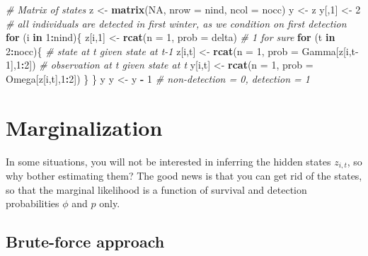 \documentclass[
  12pt,
]{krantz}
\newenvironment{Shaded}{\begin{snugshade}}{\end{snugshade}}
\newcommand{\AttributeTok}[1]{\textcolor[rgb]{0.13,0.29,0.53}{#1}}
\newcommand{\CommentTok}[1]{\textcolor[rgb]{0.56,0.35,0.01}{\textit{#1}}}
\newcommand{\ConstantTok}[1]{\textcolor[rgb]{0.56,0.35,0.01}{#1}}
\newcommand{\ControlFlowTok}[1]{\textcolor[rgb]{0.13,0.29,0.53}{\textbf{#1}}}
\newcommand{\DecValTok}[1]{\textcolor[rgb]{0.00,0.00,0.81}{#1}}
\newcommand{\FunctionTok}[1]{\textcolor[rgb]{0.13,0.29,0.53}{\textbf{#1}}}
\newcommand{\NormalTok}[1]{#1}
\newcommand{\OtherTok}[1]{\textcolor[rgb]{0.56,0.35,0.01}{#1}}
\newcommand{\SpecialCharTok}[1]{\textcolor[rgb]{0.81,0.36,0.00}{\textbf{#1}}}
\begin{document}
\begin{Shaded}
\begin{Highlighting}[]
\CommentTok{\# Matrix of states}
\NormalTok{z }\OtherTok{\textless{}{-}} \FunctionTok{matrix}\NormalTok{(}\ConstantTok{NA}\NormalTok{, }\AttributeTok{nrow =}\NormalTok{ nind, }\AttributeTok{ncol =}\NormalTok{ nocc)}
\NormalTok{y }\OtherTok{\textless{}{-}}\NormalTok{ z}
\NormalTok{y[,}\DecValTok{1}\NormalTok{] }\OtherTok{\textless{}{-}} \DecValTok{2} \CommentTok{\# all individuals are detected in first winter, as we condition on first detection}
\ControlFlowTok{for}\NormalTok{ (i }\ControlFlowTok{in} \DecValTok{1}\SpecialCharTok{:}\NormalTok{nind)\{}
\NormalTok{  z[i,}\DecValTok{1}\NormalTok{] }\OtherTok{\textless{}{-}} \FunctionTok{rcat}\NormalTok{(}\AttributeTok{n =} \DecValTok{1}\NormalTok{, }\AttributeTok{prob =}\NormalTok{ delta) }\CommentTok{\# 1 for sure}
  \ControlFlowTok{for}\NormalTok{ (t }\ControlFlowTok{in} \DecValTok{2}\SpecialCharTok{:}\NormalTok{nocc)\{}
    \CommentTok{\# state at t given state at t{-}1}
\NormalTok{    z[i,t] }\OtherTok{\textless{}{-}} \FunctionTok{rcat}\NormalTok{(}\AttributeTok{n =} \DecValTok{1}\NormalTok{, }\AttributeTok{prob =}\NormalTok{ Gamma[z[i,t}\DecValTok{{-}1}\NormalTok{],}\DecValTok{1}\SpecialCharTok{:}\DecValTok{2}\NormalTok{]) }
    \CommentTok{\# observation at t given state at t}
\NormalTok{    y[i,t] }\OtherTok{\textless{}{-}} \FunctionTok{rcat}\NormalTok{(}\AttributeTok{n =} \DecValTok{1}\NormalTok{, }\AttributeTok{prob =}\NormalTok{ Omega[z[i,t],}\DecValTok{1}\SpecialCharTok{:}\DecValTok{2}\NormalTok{]) }
\NormalTok{  \}}
\NormalTok{\}}
\NormalTok{y}
\NormalTok{y }\OtherTok{\textless{}{-}}\NormalTok{ y }\SpecialCharTok{{-}} \DecValTok{1} \CommentTok{\# non{-}detection = 0, detection = 1}
\end{Highlighting}
\end{Shaded}

\section{Marginalization}\label{marginalization}

In some situations, you will not be interested in inferring the hidden states \(z_{i,t}\), so why bother estimating them? The good news is that you can get rid of the states, so that the marginal likelihood is a function of survival and detection probabilities \(\phi\) and \(p\) only.

\subsection{Brute-force approach}\label{brute-force-approach}
\end{document}
